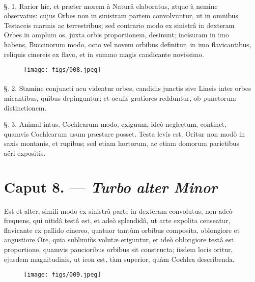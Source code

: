 \documentclass[a4paper, 11pt, oneside, polutonikogreek, german]{article}
\begin{document}
\paragraph{}
§. 1. Rarior hic, et præter morem à Naturâ elaboratus, atque à nemine observatus: cujus Orbes non in sinistram partem convolvuntur, ut in omnibus Testaceis marinis ac terrestribus; sed contrario modo ex sinistrâ in dexteram Orbes in amplum os, juxta orbis proportionem, desinunt; incisuram in imo habens, Buccinorum modo, octo vel novem orbibus definitur, in imo flavicantibus, reliquis cinereis ex flavo, et in summo magis candicante novissimo.

\begin{figure}[H]
\centering
\texttt{[image: figs/008.jpeg]}

\end{figure}
\paragraph{}
§. 2. Stamine conjuncti acu videntur orbes, candidis junctis sive Lineis inter orbes micantibus, quibus depinguntur; et oculis gratiores redduntur, ob punctorum distinctionem.

§. 3. Animal intus, Cochlearum modo, exiguum, ideò neglectum, continet, quamvis Cochlearum usum præstare posset. Testa levis est. Oritur non modò in saxis montanis, et rupibus; sed etiam hortorum, ac etiam domorum parietibus aëri expositis.

\section{Caput 8. --- \emph{Turbo alter Minor}}
\paragraph{}
Est et alter, simili modo ex sinistrâ parte in dexteram convolutus, non adeò frequens, qui nitidâ testâ est, et adeò splendidâ, ut arte expolita censeatur, flavicante ex pallido cinereo, quatuor tantùm orbibus composita, oblongiore et angustiore Ore, quia sublimiùs volutæ eriguntur, et ideò oblongiore testâ est proportione, quamvis paucioribus orbibus sit constructa; iisdem locis oritur, ejusdem magnitudinis, ut icon est, tàm superior, quàm Cochlea describenda.

\begin{figure}[H]
\centering
\texttt{[image: figs/009.jpeg]}

\end{figure}
\end{document}
